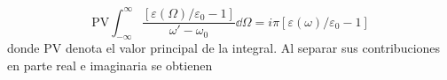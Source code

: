%
\begin{equation}
	\text{PV}\int_{-\infty}^{\infty}\frac{[\varepsilon(\Omega)/\varepsilon_0-1]}{\omega'-\omega_0} \dd{\Omega}=i\pi [\varepsilon(\omega)/\varepsilon_0-1]
\end{equation}
%
donde PV denota el valor principal de la integral. Al separar sus contribuciones en parte real e imaginaria se obtienen











